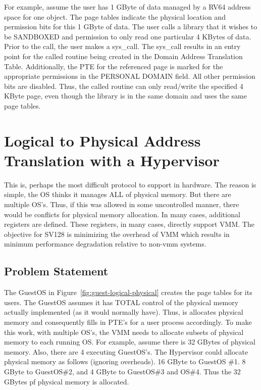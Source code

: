 \documentclass{article}
\begin{document}
For example,  assume the user has 1 GByte of data managed by a RV64 address space for one object.   The page tables indicate the physical location and permission bits for this 1 GByte of data.  The user calls a library that it wishes to be SANDBOXED and permission to only read one particular 4 KBytes of data.   Prior to the call,  the user makes a sys\_call.  The sys\_call results in an entry point for the called routine being created in the Domain Address Translation Table.  Additionally, the PTE for the referenced page is marked for the appropriate permissions in the PERSONAL DOMAIN field. All other permission bits are disabled.  Thus, the called routine can only read/write the specified 4 KByte page,  even though the library is in the same domain and uses the same page tables.






\section{Logical to Physical Address Translation with a Hypervisor}


This is, perhaps the most difficult   protocol to support in hardware.  The reason is simple,  the OS thinks it manages ALL of physical memory.  But there  are multiple OS’s.  Thus, if this was allowed in some uncontrolled manner, there would be conflicts for physical memory allocation. In many cases,  additional registers are defined.  These registers, in many cases,  directly support VMM.  The objective for SV128 is minimizing the overhead of VMM which results in minimum performance degradation relative to non-vmm systems.

\subsection{Problem Statement}

The GuestOS in Figure~\ref{fig:guest-logical-physical} creates the page tables for its users.  The GuestOS assumes it has TOTAL control of the physical memory actually implemented (as it would normally have).  Thus, is allocates physical memory and  consequently fills in PTE’s for a user process accordingly.    To make this work, with multiple OS’s,  the VMM needs to allocate subsets of physical memory to each running OS.  For example,  assume there is 32 GBytes of physical memory.  Also, there are 4 executing GuestOS’s.  The Hypervisor could allocate physical memory as follows (ignoring overheads).  16 GByte to GuestOS \#1.  8 GByte to GuestOS\#2,  and 4 GByte to GuestOS\#3 and OS\#4. Thus the 32 GBytes pf physical memory is allocated.  
\end{document}
